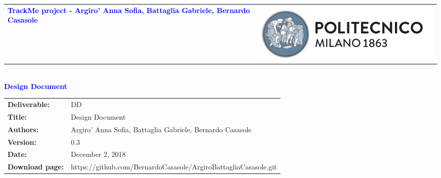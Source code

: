 




\begin{titlepage}


{\begin{table}[t!]
\centering
\begin{tabu} to \textwidth { X[1.3,r,p] X[1.7,l,p] }
\textcolor{Blue}{\textbf{\small{TrackMe project - Argiro' Anna Sofia, Battaglia Gabriele, Bernardo Casasole}}} & \includegraphics[scale=0.5]{images/PolimiLogo}
\end{tabu}
\end{table}}~\\ [7cm]


\centering
{\textcolor{Blue}{\textbf{\Huge{Design Document}}}} \\ [1cm]

\end{titlepage}

\begin{table}[h!]
\begin{tabu} to \textwidth { X[0.3,r,p] X[0.7,l,p] }
\hline

\textbf{Deliverable:} & DD\\
\textbf{Title:} & Design Document \\
\textbf{Authors:} & Argiro' Anna Sofia, Battaglia Gabriele, Bernardo Casasole \\
\textbf{Version:} & 0.3 \\
\textbf{Date:} & December 2, 2018 \\
\textbf{Download page:} & https://github.com/BernardoCasasole/ArgiroBattagliaCasasole.git \\
\hline
\end{tabu}
\end{table}

\setcounter{page}{2}

\newpage
{}
\tableofcontents

